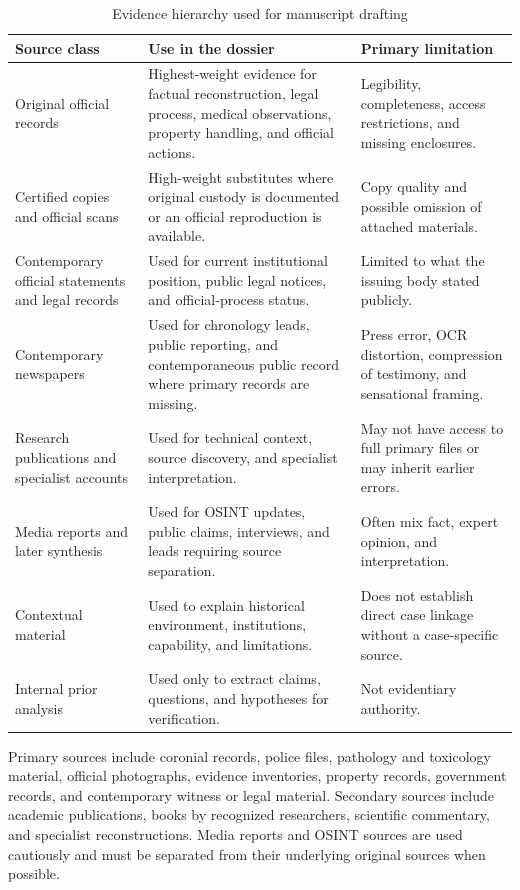 \begin{table}[htbp]
\centering
\caption{Evidence hierarchy used for manuscript drafting}
\label{tab:methodology-evidence-hierarchy}
\begin{tabularx}{\textwidth}{p{}X p{}}
\toprule
Source class & Use in the dossier & Primary limitation \\
\midrule
Original official records & Highest-weight evidence for factual reconstruction, legal process, medical observations, property handling, and official actions. & Legibility, completeness, access restrictions, and missing enclosures. \\
Certified copies and official scans & High-weight substitutes where original custody is documented or an official reproduction is available. & Copy quality and possible omission of attached materials. \\
Contemporary official statements and legal records & Used for current institutional position, public legal notices, and official-process status. & Limited to what the issuing body stated publicly. \\
Contemporary newspapers & Used for chronology leads, public reporting, and contemporaneous public record where primary records are missing. & Press error, OCR distortion, compression of testimony, and sensational framing. \\
Research publications and specialist accounts & Used for technical context, source discovery, and specialist interpretation. & May not have access to full primary files or may inherit earlier errors. \\
Media reports and later synthesis & Used for OSINT updates, public claims, interviews, and leads requiring source separation. & Often mix fact, expert opinion, and interpretation. \\
Contextual material & Used to explain historical environment, institutions, capability, and limitations. & Does not establish direct case linkage without a case-specific source. \\
Internal prior analysis & Used only to extract claims, questions, and hypotheses for verification. & Not evidentiary authority. \\
\bottomrule
\end{tabularx}
\end{table}

Primary sources include coronial records, police files, pathology and toxicology material, official photographs, evidence inventories, property records, government records, and contemporary witness or legal material. Secondary sources include academic publications, books by recognized researchers, scientific commentary, and specialist reconstructions. Media reports and OSINT sources are used cautiously and must be separated from their underlying original sources when possible.

